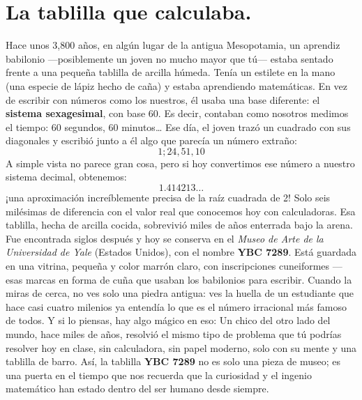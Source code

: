 
\vspace{0.5cm}

\vspace{1em}
\section*{La tablilla que calculaba.}

\begin{reseñaplana}
Hace unos 3{,}800 años, en algún lugar de la antigua Mesopotamia, un aprendiz babilonio —posiblemente 
un joven no mucho mayor que tú— estaba sentado frente a una pequeña tablilla de arcilla húmeda. 
Tenía un estilete en la mano (una especie de lápiz hecho de caña) y estaba aprendiendo matemáticas.
En vez de escribir con números como los nuestros, él usaba una base diferente: el \textbf{sistema sexagesimal}, 
con base 60. Es decir, contaban como nosotros medimos el tiempo: 60 segundos, 60 minutos…
Ese día, el joven trazó un cuadrado con sus diagonales y escribió junto a él algo que parecía un número extraño:
\[
1;24,51,10
\]
A simple vista no parece gran cosa, pero si hoy convertimos ese número a nuestro sistema decimal, obtenemos:
\[
1.414213\dots
\]
¡una aproximación increíblemente precisa de la raíz cuadrada de 2!
Solo seis milésimas de diferencia con el valor real que conocemos hoy con calculadoras.
Esa tablilla, hecha de arcilla cocida, sobrevivió miles de años enterrada bajo la arena. Fue encontrada siglos
después y hoy se conserva en el \textit{Museo de Arte de la Universidad de Yale} (Estados Unidos), con el 
nombre \textbf{YBC 7289}.
Está guardada en una vitrina, pequeña y color marrón claro, con inscripciones cuneiformes 
—esas marcas en forma de cuña que usaban los babilonios para escribir.
Cuando la miras de cerca, no ves solo una piedra antigua: ves la huella de un estudiante que hace casi cuatro 
milenios ya entendía lo que es el número irracional más famoso de todos.
Y si lo piensas, hay algo mágico en eso:
Un chico del otro lado del mundo, hace miles de años, resolvió el mismo tipo de problema que tú podrías 
resolver hoy en clase, sin calculadora, sin papel moderno, solo con su mente y una tablilla de barro.
Así, la tablilla \textbf{YBC 7289} no es solo una pieza de museo; es una puerta en el tiempo que nos recuerda 
que la curiosidad y el ingenio matemático han estado dentro del ser humano desde siempre.
\end{reseñaplana}
